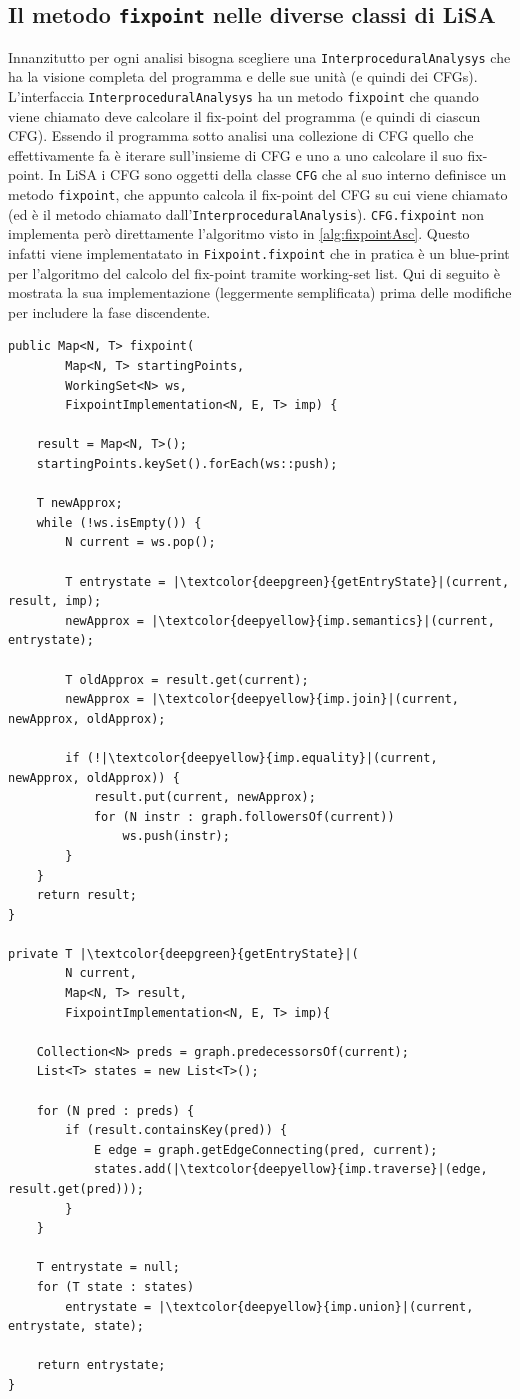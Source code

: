 \subsection{Il metodo \texttt{fixpoint} nelle diverse classi di LiSA}
Innanzitutto per ogni analisi bisogna scegliere una \texttt{InterproceduralAnalysys} che ha la visione completa del programma e delle sue unità (e quindi dei CFGs). L'interfaccia \texttt{InterproceduralAnalysys} ha un metodo \texttt{fixpoint} che quando viene chiamato deve calcolare il fix-point del programma (e quindi di ciascun CFG). Essendo il programma sotto analisi una collezione di CFG quello che effettivamente fa è iterare sull'insieme di CFG e uno a uno calcolare il suo fix-point. In LiSA i CFG sono oggetti della classe \texttt{CFG} che al suo interno definisce un metodo \texttt{fixpoint}, che appunto calcola il fix-point del CFG su cui viene chiamato (ed è il metodo chiamato dall'\texttt{InterproceduralAnalysis}). \texttt{CFG.fixpoint} non implementa però direttamente l'algoritmo visto in \ref{alg:fixpointAsc}. Questo infatti viene implementatato in \texttt{Fixpoint.fixpoint} che in pratica è un blue-print per l'algoritmo del calcolo del fix-point tramite working-set list. Qui di seguito è mostrata la sua implementazione (leggermente semplificata) prima delle modifiche per includere la fase discendente. 
\begin{lstlisting}[belowskip=-1.1 \baselineskip, escapechar=|]
public Map<N, T> fixpoint(
        Map<N, T> startingPoints,
        WorkingSet<N> ws,
        FixpointImplementation<N, E, T> imp) {

    result = Map<N, T>();
    startingPoints.keySet().forEach(ws::push);

    T newApprox;
    while (!ws.isEmpty()) {
        N current = ws.pop();

        T entrystate = |\textcolor{deepgreen}{getEntryState}|(current, result, imp);
        newApprox = |\textcolor{deepyellow}{imp.semantics}|(current, entrystate);

        T oldApprox = result.get(current);
        newApprox = |\textcolor{deepyellow}{imp.join}|(current, newApprox, oldApprox);

        if (!|\textcolor{deepyellow}{imp.equality}|(current, newApprox, oldApprox)) {
            result.put(current, newApprox);
            for (N instr : graph.followersOf(current))
                ws.push(instr);
        }
    }
    return result;
}

private T |\textcolor{deepgreen}{getEntryState}|(
        N current,
        Map<N, T> result,
        FixpointImplementation<N, E, T> imp){
    
    Collection<N> preds = graph.predecessorsOf(current);
    List<T> states = new List<T>();

    for (N pred : preds) {
        if (result.containsKey(pred)) {
            E edge = graph.getEdgeConnecting(pred, current);
            states.add(|\textcolor{deepyellow}{imp.traverse}|(edge, result.get(pred)));
        }
    }

    T entrystate = null;
    for (T state : states)
        entrystate = |\textcolor{deepyellow}{imp.union}|(current, entrystate, state);

    return entrystate;
}
\end{lstlisting}
